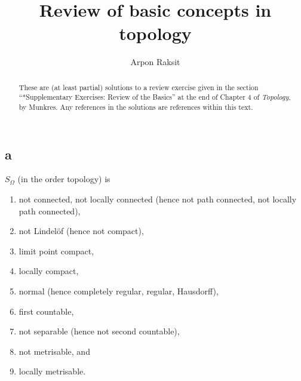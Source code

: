 

\title{Review of basic concepts in topology}
\author{Arpon Raksit}
\date{}



\begin{abstract}
  These are (at least partial) solutions to a review exercise given in the section ``*Supplementary Exercises: Review of the Basics'' at the end of Chapter 4 of \emph{Topology}, by Munkres. Any references in the solutions are references within this text.
\end{abstract}
\maketitle
\thispagestyle{fancy}

\subsection*{a}
  $S_\Omega$ (in the order topology) is
  \begin{enumerate}
  \item not connected, not locally connected (hence not path connected, not locally path connected),
  \item not Lindel\"of (hence not compact),
  \item limit point compact,
  \item locally compact,
  \item normal (hence completely regular, regular, Hausdorff),
  \item first countable,
  \item not separable (hence not second countable),
  \item not metrisable, and
  \item locally metrisable.
  \end{enumerate}

